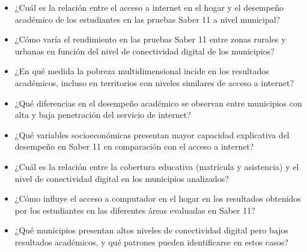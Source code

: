 \begin{itemize}
    \item ¿Cuál es la relación entre el acceso a internet en el hogar y el desempeño académico de los estudiantes en las pruebas Saber 11 a nivel municipal?
    \item ¿Cómo varía el rendimiento en las pruebas Saber 11 entre zonas rurales y urbanas en función del nivel de conectividad digital de los municipios?
    \item ¿En qué medida la pobreza multidimensional incide en los resultados académicos, incluso en territorios con niveles similares de acceso a internet?
    \item ¿Qué diferencias en el desempeño académico se observan entre municipios con alta y baja penetración del servicio de internet?
    \item ¿Qué variables socioeconómicas presentan mayor capacidad explicativa del desempeño en Saber 11 en comparación con el acceso a internet?
    \item ¿Cuál es la relación entre la cobertura educativa (matrícula y asistencia) y el nivel de conectividad digital en los municipios analizados?
    \item ¿Cómo influye el acceso a computador en el hogar en los resultados obtenidos por los estudiantes en las diferentes áreas evaluadas en Saber 11?
    \item ¿Qué municipios presentan altos niveles de conectividad digital pero bajos resultados académicos, y qué patrones pueden identificarse en estos casos?
\end{itemize}
